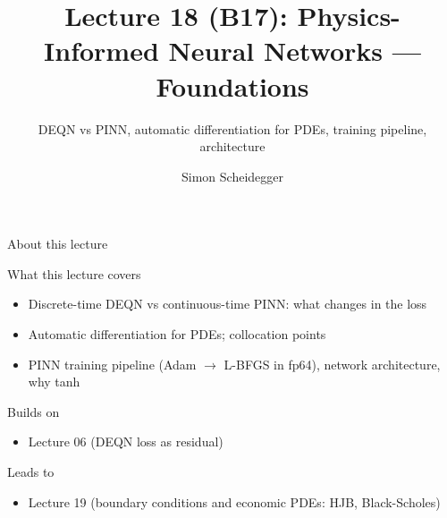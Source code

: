 \documentclass[aspectratio=169,11pt]{beamer}
\title[Lecture 18 (B17)]{Lecture 18 (B17): Physics-Informed Neural Networks --- Foundations}
\subtitle{DEQN vs PINN, automatic differentiation for PDEs, training pipeline, architecture}
\author{Simon Scheidegger}
\institute{HEC, University of Lausanne}
\date{}
\begin{document}
\providecommand{\exercisepause}{%
  \tikz[baseline=(X.base)]{\node[fill=darkgreen!80!black, text=white,
  rounded corners=2pt, inner sep=3pt, font=\scriptsize\bfseries](X){PAUSE};}}

{
\begin{frame}
\titlepage
\end{frame}
}

\begin{frame}{About this lecture}
\small
\begin{block}{What this lecture covers}
\begin{itemize}\itemsep2pt
  \item Discrete-time DEQN vs continuous-time PINN: what changes in the loss
  \item Automatic differentiation for PDEs; collocation points
  \item PINN training pipeline (Adam $\to$ L-BFGS in fp64), network architecture, why tanh
\end{itemize}
\end{block}
\begin{block}{Builds on}
\begin{itemize}\itemsep2pt
  \item Lecture 06 (DEQN loss as residual)
\end{itemize}
\end{block}
\begin{block}{Leads to}
\begin{itemize}\itemsep2pt
  \item Lecture 19 (boundary conditions and economic PDEs: HJB, Black-Scholes)
\end{itemize}
\end{block}
\end{frame}
\end{document}
